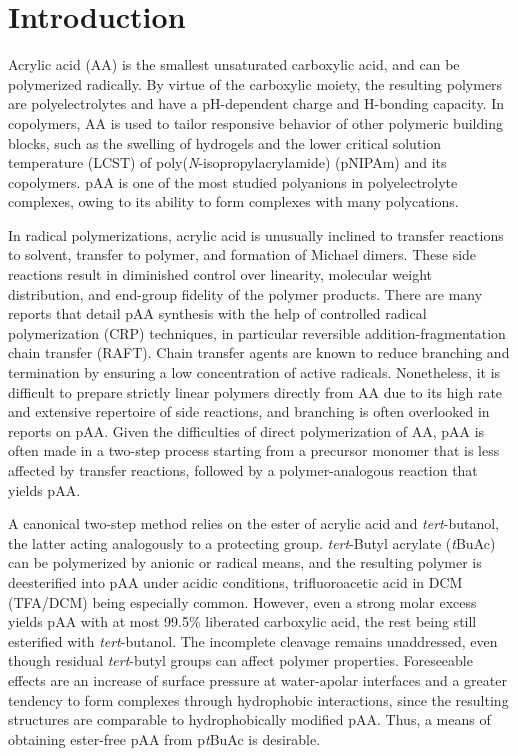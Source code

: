 \documentclass{article}
\begin{document}
\section*{Introduction}
Acrylic acid (AA) is the smallest unsaturated carboxylic acid, and can be polymerized radically. By virtue of the 
carboxylic moiety, the resulting polymers are polyelectrolytes and have a pH-dependent charge and H-bonding capacity. 
In copolymers, AA is used to tailor responsive behavior of other polymeric building blocks, 
such as the swelling of hydrogels \cite{Lue2011, Yoo2000} and the lower critical solution temperature (LCST) 
of poly(\emph{N}-isopropylacrylamide) (pNIPAm) and its copolymers. \cite{Bokias2000} pAA is one of the most studied
polyanions in polyelectrolyte complexes, owing to its ability to form complexes with many polycations. 
\cite{Blocher2017, Liu2017}

In radical polymerizations, acrylic acid is unusually inclined to transfer reactions to solvent,\cite{Loiseau2003a} 
transfer to polymer,\cite{Lena2017} and formation of Michael dimers.\cite{LLauro2004} These side reactions result in diminished control 
over linearity, molecular weight distribution, and end-group fidelity of the polymer products.\cite{Maniego2013, LLauro2004} There are many
reports that detail pAA synthesis with the help of controlled radical polymerization (CRP) techniques, in particular reversible addition-fragmentation 
chain transfer (RAFT).\cite{Pelet2012, Loiseau2003a, Chaduc2013} Chain transfer agents are known to reduce branching and termination by ensuring 
a low concentration of active radicals.\cite{Lena2017} Nonetheless, it is difficult to prepare strictly linear polymers directly from AA
due to its high rate and extensive repertoire of side reactions, and branching is often overlooked in reports on pAA. \cite{Loiseau2003a, LLauro2004} 
Given the difficulties of direct polymerization of AA, pAA is often made in a two-step process starting from a precursor monomer that is less affected 
by transfer reactions, followed by a polymer-analogous reaction that yields pAA. 

A canonical two-step method relies on the ester of acrylic acid and \emph{tert}-butanol, the latter acting analogously to a protecting group. 
\emph{tert}-Butyl acrylate (\emph{t}BuAc) can be polymerized by anionic or radical means, and the resulting polymer is deesterified into pAA under acidic conditions,
trifluoroacetic acid in DCM (TFA/DCM) being especially common. \cite{Dulong2015, Yong2016, Chen2013a, Li2006, Li2008a, Lauber2017} 
However, even a strong molar excess yields pAA with at most 99.5\% liberated 
carboxylic acid, the rest being still esterified with 
\emph{tert}-butanol.\cite{Loiseau2003a, Chen2013a}  The 
incomplete cleavage remains unaddressed, even though residual \emph{tert}-butyl groups 
can affect polymer properties. Foreseeable effects are an increase of surface pressure at water-apolar interfaces and a greater tendency to 
form complexes through hydrophobic interactions, since the resulting structures are comparable to hydrophobically modified pAA. Thus, a means 
of obtaining ester-free pAA from p\emph{t}BuAc is desirable.
\end{document}
